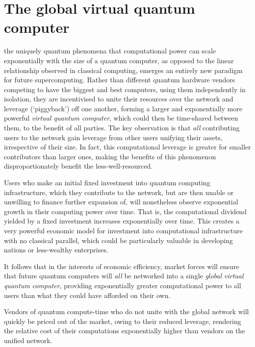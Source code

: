 \section{The global virtual quantum computer} \label{sec:GVQC} 

 the uniquely quantum phenomena that computational power can scale exponentially with the size of a quantum computer, as opposed to the linear relationship observed in classical computing, emerges an entirely new paradigm for future supercomputing. Rather than different quantum hardware vendors competing to have the biggest and best computers, using them independently in isolation, they are incentivised to unite their resources over the network and leverage (`piggyback') off one another, forming a larger and exponentially more powerful \textit{virtual quantum computer}, which could then be time-shared between them, to the benefit of all parties. The key observation is that \textit{all} contributing users to the network gain leverage from other users unifying their assets, irrespective of their size. In fact, this computational leverage is greater for smaller contributors than larger ones, making the benefits of this phenomenon disproportionately benefit the less-well-resourced.

Users who make an initial fixed investment into quantum computing infrastructure, which they contribute to the network, but are then unable or unwilling to finance further expansion of, will nonetheless observe exponential growth in their computing power over time. That is, the computational dividend yielded by a fixed investment increases exponentially over time. This creates a very powerful economic model for investment into computational infrastructure with no classical parallel, which could be particularly valuable in developing nations or less-wealthy enterprises.

It follows that in the interests of economic efficiency, market forces will ensure that future quantum computers will \textit{all} be networked into a single \textit{global virtual quantum computer}, providing exponentially greater computational power to all users than what they could have afforded on their own.

Vendors of quantum compute-time who do not unite with the global network will quickly be priced out of the market, owing to their reduced leverage, rendering the relative cost of their computations exponentially higher than vendors on the unified network.

